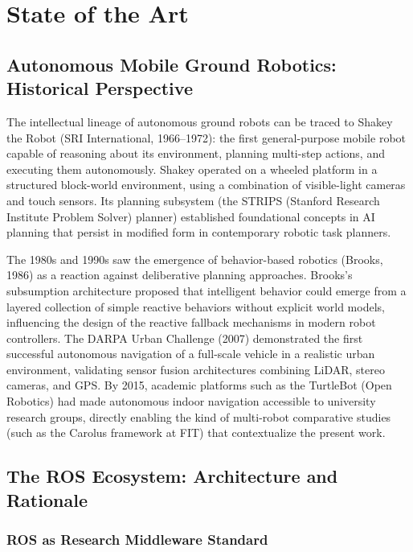 \chapter{State of the Art}
\label{ch:lit-review}

\section{Autonomous Mobile Ground Robotics: Historical Perspective}

The intellectual lineage of autonomous ground robots can be traced to Shakey the Robot (SRI International, 1966--1972): the first general-purpose mobile robot capable of reasoning about its environment, planning multi-step actions, and executing them autonomously. Shakey operated on a wheeled platform in a structured block-world environment, using a combination of visible-light cameras and touch sensors. Its planning subsystem (the STRIPS (Stanford Research Institute Problem Solver) planner) established foundational concepts in AI planning that persist in modified form in contemporary robotic task planners.

The 1980s and 1990s saw the emergence of behavior-based robotics (Brooks, 1986) as a reaction against deliberative planning approaches. Brooks's subsumption architecture proposed that intelligent behavior could emerge from a layered collection of simple reactive behaviors without explicit world models, influencing the design of the reactive fallback mechanisms in modern robot controllers. The DARPA Urban Challenge (2007) demonstrated the first successful autonomous navigation of a full-scale vehicle in a realistic urban environment, validating sensor fusion architectures combining LiDAR, stereo cameras, and GPS. By 2015, academic platforms such as the TurtleBot (Open Robotics) had made autonomous indoor navigation accessible to university research groups, directly enabling the kind of multi-robot comparative studies (such as the Carolus framework at FIT) that contextualize the present work.

\section{The ROS Ecosystem: Architecture and Rationale}

\subsection{ROS as Research Middleware Standard}

